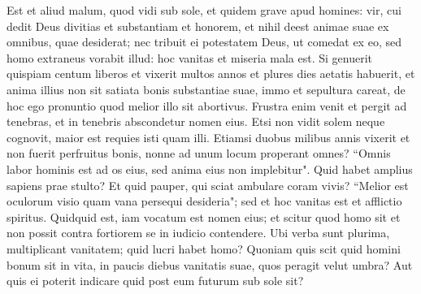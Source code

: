 \begin{biblechapter}  
\verse Est et aliud malum, quod vidi sub sole, et quidem grave apud homines:  
\verse vir, cui dedit Deus divitias et substantiam et honorem, et nihil deest animae suae ex omnibus, quae desiderat; nec tribuit ei potestatem Deus, ut comedat ex eo, sed homo extraneus vorabit illud: hoc vanitas et miseria mala est. 
\verse Si genuerit quispiam centum liberos et vixerit multos annos et plures dies aetatis habuerit, et anima illius non sit satiata bonis substantiae suae, immo et sepultura careat, de hoc ego pronuntio quod melior illo sit abortivus. 
\verse Frustra enim venit et pergit ad tenebras, et in tenebris abscondetur nomen eius.  
\verse Etsi non vidit solem neque cognovit, maior est requies isti quam illi. 
\verse Etiamsi duobus milibus annis vixerit et non fuerit perfruitus bonis, nonne ad unum locum properant omnes? 
\verse “Omnis labor hominis est ad os eius, sed anima eius non implebitur". 
\verse Quid habet amplius sapiens prae stulto? Et quid pauper, qui sciat ambulare coram vivis? 
\verse “Melior est oculorum visio quam vana persequi desideria"; sed et hoc vanitas est et afflictio spiritus. 
\verse Quidquid est, iam vocatum est nomen eius; et scitur quod homo sit et non possit contra fortiorem se in iudicio contendere. 
\verse Ubi verba sunt plurima, multiplicant vanitatem; quid lucri habet homo? 
\verse Quoniam quis scit quid homini bonum sit in vita, in paucis diebus vanitatis suae, quos peragit velut umbra? Aut quis ei poterit indicare quid post eum futurum sub sole sit? 
\end{biblechapter}

